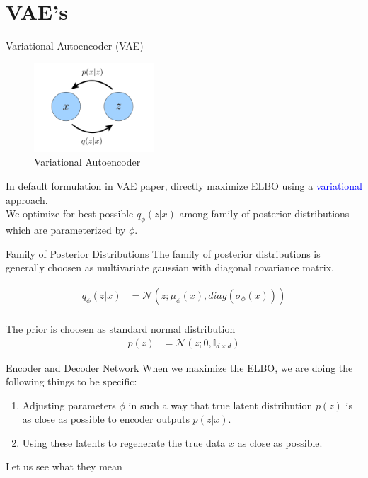 \section*{VAE's}
\begin{frame}{Variational Autoencoder (VAE)}
    \begin{figure}
        \centering
        \includegraphics[width=0.4\textwidth]{Images/vae1.png}
        \caption{Variational Autoencoder}
    \end{figure}

    In default formulation in VAE paper, directly maximize ELBO using a \textcolor{blue}{variational} approach. \\

    We optimize for best possible $q_{\phi}(z|x)$ among family of posterior distributions which are parameterized by $\phi$.

\end{frame} 

\begin{frame}{Family of Posterior Distributions}
    The family of posterior distributions is generally choosen as multivariate gaussian with diagonal covariance matrix.

    \begin{align*}
        q_{\phi}(z|x) &= \mathcal{N}(z;\mu_{\phi}(x), diag(\sigma_{\phi}(x))) \\
    \end{align*}

    The prior is choosen as standard normal distribution 
    \begin{align*}
        p(z) &= \mathcal{N}(z;0, \mathbb{I}_{d \times d})
    \end{align*}
\end{frame}

\begin{frame}{Encoder and Decoder Network}
    When we maximize the ELBO, we are doing the following things to be specific:
    \begin{enumerate}
        \item Adjusting parameters $\phi$ in such a way that true latent distribution $p(z)$ is as close as possible to encoder outputs $p(z|x)$.
        \item Using these latents to regenerate the true data $x$ as close as possible.
    \end{enumerate}

    Let us see what they mean
\end{frame}

